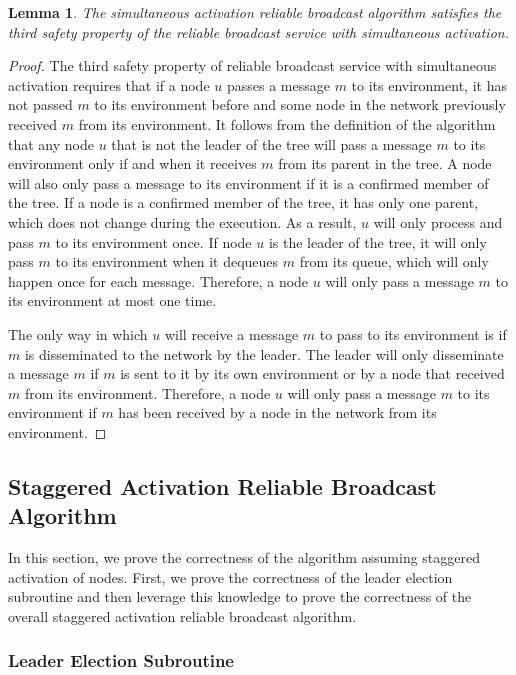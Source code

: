 \documentclass[english]{article}
\newtheorem{lemma}[theorem]{Lemma}
\begin{document}
\begin{lemma}
\label{StaticRBSafety3}
The simultaneous activation reliable broadcast algorithm satisfies the third safety property of the reliable broadcast service with simultaneous activation.
\end{lemma}
\begin{proof}

The third safety property of reliable broadcast service with simultaneous activation requires that if a node $u$ passes a message $m$ to its environment, it has not passed $m$ to its environment before and some node in the network previously received $m$ from its environment. It follows from the definition of  the algorithm that any node $u$ that is not the leader of the tree will pass a message $m$ to its environment only if and when it receives $m$ from its parent in the tree. A node will also only pass a message to its environment if it is a confirmed member of the tree. If a node is a confirmed member of the tree, it has only one parent, which does not change during the execution. As a result, $u$ will only process and pass $m$ to its environment once. If node $u$ is the leader of the tree, it will only pass $m$ to its environment when it dequeues $m$ from its queue, which will only happen once for each message. Therefore, a node $u$ will only pass a message $m$ to its environment at most one time.

The only way in which $u$ will receive a message $m$ to pass to its environment is if $m$ is disseminated to the network by the leader. The leader will only disseminate a message $m$ if $m$ is sent to it by its own environment or by a node that received $m$ from its environment. Therefore, a node $u$ will only pass a message $m$ to its environment if $m$ has been received by a node in the network from its environment.

\end{proof}


\subsection {Staggered Activation Reliable Broadcast Algorithm}

In this section, we prove the correctness of the algorithm assuming staggered activation of nodes. First, we prove the correctness of the leader election subroutine and then leverage this knowledge to prove the correctness of the overall staggered activation reliable broadcast algorithm.

\subsubsection{Leader Election Subroutine}
\end{document}
